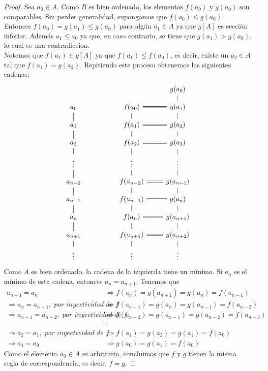 \begin{proof}
Sea $a_0\in A$. Como $B$ es bien ordenado, los elementos $f(a_0)$ y $g(a_0)$ son comparables. Sin perder generalidad, supongamos que $f(a_0)\leq g(a_0)$.\\
Entonces $f(a_0)=g(a_1)\leq g(a_0)$ para algún $a_1\in A$ ya que $g[A]$ es sección inferior. Además $a_1\leq a_0$ ya que, en caso contrario, se tiene que $g(a_1)>g(a_0)$, lo cual es una contradiccion.\\
Notemos que $f(a_1)\in g[A]$ ya que $f(a_1)\leq f(a_0)$, es decir, existe un $a_2\in A$ tal que $f(a_1)=g(a_2)$. Repitiendo este proceso obtenemos las siguientes cadenas:
\[
\begin{tikzcd}[row sep=3mm]
                  &  &                                & g(a_0)               \\
a_0               &  & f(a_0) \arrow[r,equal]               & g(a_1) \arrow[u,no head]     \\
a_1 \arrow[u,no head]     &  & f(a_1) \arrow[u,no head] \arrow[r,equal]     & g(a_2) \arrow[u,no head]     \\
a_2 \arrow[u,no head]     &  & f(a_2) \arrow[u,no head] \arrow[r,equal]     & g(a_3) \arrow[u,no head]     \\
\vdots \arrow[u,no head]  &  & \vdots \arrow[u,no head]               & \vdots \arrow[u,no head]     \\
a_{n-2} \arrow[u,no head] &  & f(a_{n-2}) \arrow[u,no head] \arrow[r,equal] & g(a_{n-1}) \arrow[u,no head] \\
a_{n-1} \arrow[u,no head] &  & f(a_{n-1}) \arrow[u,no head] \arrow[r,equal] & g(a_n) \arrow[u,no head]     \\
a_{n} \arrow[u,no head]   &  & f(a_n) \arrow[u,no head] \arrow[r,equal]     & g(a_{n+1}) \arrow[u,no head] \\
a_{n+1} \arrow[u,no head] &  & f(a_{n+1}) \arrow[u,no head] \arrow[r,equal] & g(a_{n+2}) \arrow[u,no head] \\
\vdots \arrow[u,no head]  &  & \vdots \arrow[u,no head]               & \vdots \arrow[u,no head]    
\end{tikzcd}
\]
Como $A$ es bien ordenado, la cadena de la izquierda tiene un mínimo. Si $a_n$ es el mínimo de esta cadena, entonces $a_n=a_{n+1}$.
Tenemos que
\begin{align*}
a_{n+1}=a_n&\Rightarrow f(a_n)=g(a_{n+1})=g(a_n)=f(a_{n-1})\\
\Rightarrow a_n=a_{n-1}, \textit{ por inyectividad de f}&\Rightarrow f(a_{n-1})=g(a_n)=g(a_{n-1})=f(a_{n-2})\\
\Rightarrow a_{n-1}=a_{n-2},\textit{ por inyectividad de f}&\Rightarrow f(a_{n-2})=g(a_{n-1})=g(a_{n-2})=f(a_{n-3})\\
&\vdots\\
\Rightarrow a_2=a_1,\textit{ por inyectividad de f}&\Rightarrow f(a_1)=g(a_2)=g(a_1)=f(a_0)\\
\Rightarrow a_1=a_0&\Rightarrow g(a_0)=g(a_1)=f(a_0)
\end{align*}
Como el elemento $a_0\in A$ es arbitrario, concluimos que $f$ y $g$ tienen la misma regla de correspondencia, es decir, $f=g$.
\end{proof}
